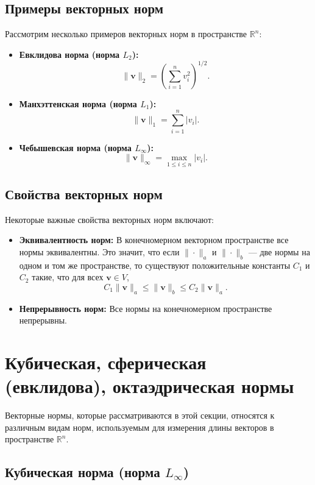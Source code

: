 \documentclass{article}
\begin{document}
\subsection{Примеры векторных норм}

Рассмотрим несколько примеров векторных норм в пространстве $\mathbb{R}^n$:

\begin{itemize}
    \item \textbf{Евклидова норма (норма $L_2$):}
    \[
    \|\mathbf{v}\|_2 = \left( \sum_{i=1}^n v_i^2 \right)^{1/2}.
    \]
    
    \item \textbf{Манхэттенская норма (норма $L_1$):}
    \[
    \|\mathbf{v}\|_1 = \sum_{i=1}^n |v_i|.
    \]
    
    \item \textbf{Чебышевская норма (норма $L_\infty$):}
    \[
    \|\mathbf{v}\|_\infty = \max_{1 \leq i \leq n} |v_i|.
    \]
\end{itemize}

\subsection{Свойства векторных норм}

Некоторые важные свойства векторных норм включают:

\begin{itemize}
    \item \textbf{Эквивалентность норм:} В конечномерном векторном пространстве все нормы эквивалентны. Это значит, что если $\|\cdot\|_a$ и $\|\cdot\|_b$ — две нормы на одном и том же пространстве, то существуют положительные константы $C_1$ и $C_2$ такие, что для всех $\mathbf{v} \in V$,
    \[
    C_1 \|\mathbf{v}\|_a \leq \|\mathbf{v}\|_b \leq C_2 \|\mathbf{v}\|_a.
    \]
    
    \item \textbf{Непрерывность норм:} Все нормы на конечномерном пространстве непрерывны.
\end{itemize}
\section{Кубическая, сферическая (евклидова), октаэдрическая нормы}
Векторные нормы, которые рассматриваются в этой секции, относятся к различным видам норм, используемым для измерения длины векторов в пространстве $\mathbb{R}^n$.

\subsection{Кубическая норма (норма $L_\infty$)}
\end{document}
